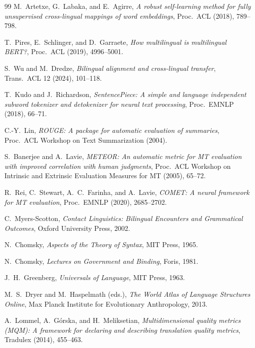 \documentclass[12pt,a4paper]{article}
\theoremstyle{remark}
\begin{document}
\begin{thebibliography}{99}
M.~Artetxe, G.~Labaka, and E.~Agirre,
\emph{A robust self-learning method for fully unsupervised
  cross-lingual mappings of word embeddings},
Proc.\ ACL (2018), 789--798.

T.~Pires, E.~Schlinger, and D.~Garraete,
\emph{How multilingual is multilingual BERT?},
Proc.\ ACL (2019), 4996--5001.

S.~Wu and M.~Dredze,
\emph{Bilingual alignment and cross-lingual transfer},
Trans.\ ACL 12 (2024), 101--118.

T.~Kudo and J.~Richardson,
\emph{SentencePiece: A simple and language independent subword
  tokenizer and detokenizer for neural text processing},
Proc.\ EMNLP (2018), 66--71.

C.-Y.~Lin,
\emph{ROUGE: A package for automatic evaluation of summaries},
Proc.\ ACL Workshop on Text Summarization (2004).

S.~Banerjee and A.~Lavie,
\emph{METEOR: An automatic metric for MT evaluation with improved
  correlation with human judgments},
Proc.\ ACL Workshop on Intrinsic and Extrinsic Evaluation Measures
  for MT (2005), 65--72.

R.~Rei, C.~Stewart, A.~C.~Farinha, and A.~Lavie,
\emph{COMET: A neural framework for MT evaluation},
Proc.\ EMNLP (2020), 2685--2702.

C.~Myers-Scotton,
\emph{Contact Linguistics: Bilingual Encounters and Grammatical Outcomes},
Oxford University Press, 2002.

N.~Chomsky,
\emph{Aspects of the Theory of Syntax},
MIT Press, 1965.

N.~Chomsky,
\emph{Lectures on Government and Binding},
Foris, 1981.

J.~H.~Greenberg,
\emph{Universals of Language},
MIT Press, 1963.

M.~S.~Dryer and M.~Haspelmath (eds.),
\emph{The World Atlas of Language Structures Online},
Max Planck Institute for Evolutionary Anthropology, 2013.

A.~Lommel, A.~G{\'o}rska, and H.~Meliksetian,
\emph{Multidimensional quality metrics (MQM): A framework for
  declaring and describing translation quality metrics},
Tradulex (2014), 455--463.


\end{thebibliography}
\end{document}
